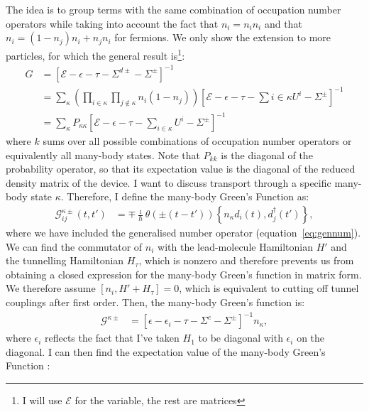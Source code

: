 The idea is to group terms with the same combination of occupation number operators while taking into account the fact that $n_i = n_i n_i$ and that $n_i = (1-n_j)n_i + n_j n_i$  for fermions. We only show the extension to more particles, for which the general result is\footnote{I will use $\mathscr{E}$ for the variable, the rest are matrices}:
\begin{align}
G &= \left[ \mathscr{E} - \epsilon - \tau -\Sigma^{d\pm} - \Sigma^\pm \right]^{-1} \nonumber\\
&= \sum_\kappa \left( \prod_{i\in\kappa} \prod_{j\notin\kappa} n_i (1-n_j) \right) \left[ \mathscr{E} - \epsilon -\tau - \sum{i \in \kappa}U^i - \Sigma^\pm \right]^{-1} \nonumber\\
&= \sum_\kappa P_{\kappa\kappa} \left[ \mathscr{E} - \epsilon - \tau - \sum_{i\in\kappa} U^i - \Sigma^\pm \right]^{-1} \label{eq:grouping}
\end{align}
where $k$ sums over all possible combinations of occupation number operators or equivalently all many-body states. Note that $P_{kk}$ is the diagonal of the probability operator, so that its expectation value is the diagonal of the reduced density matrix of the device. I want to discuss transport through a specific many-body state $\kappa$. Therefore, I define the many-body Green's Function as:
\begin{align}
\mathscr{G}^{\kappa\pm}_{ij} (t,t') &= \mp \frac{\imath}{\hbar} \theta(\pm(t-t'))\left\{ n_\kappa d_i(t), d_j^\dagger (t')\right\},
\label{eq:mbgfdef}
\end{align}
where we have included the generalised number operator (equation~\ref{eq:gennum}). We can find the commutator of $n_i$ with the lead-molecule Hamiltonian $H'$ and the tunnelling Hamiltonian $H_\tau$, which is nonzero and therefore prevents us from obtaining a closed expression for the many-body Green's function in matrix form. We therefore assume $\left[ n_i, H' + H_\tau \right]=0$, which is equivalent to cutting off tunnel couplings after first order. Then, the many-body Green's function is:
\begin{align}
\mathscr{G}^{\kappa\pm} &= \left[ \epsilon - \epsilon_i - \tau - \Sigma^c - \Sigma^\pm\right]^{-1} n_\kappa,
\label{eq:mbgfmatrix}
\end{align}
where $\epsilon_i$ reflects the fact that I've taken $H_1$ to be diagonal with $\epsilon_i$ on the diagonal. I can then find the expectation value of the many-body Green's Function :
